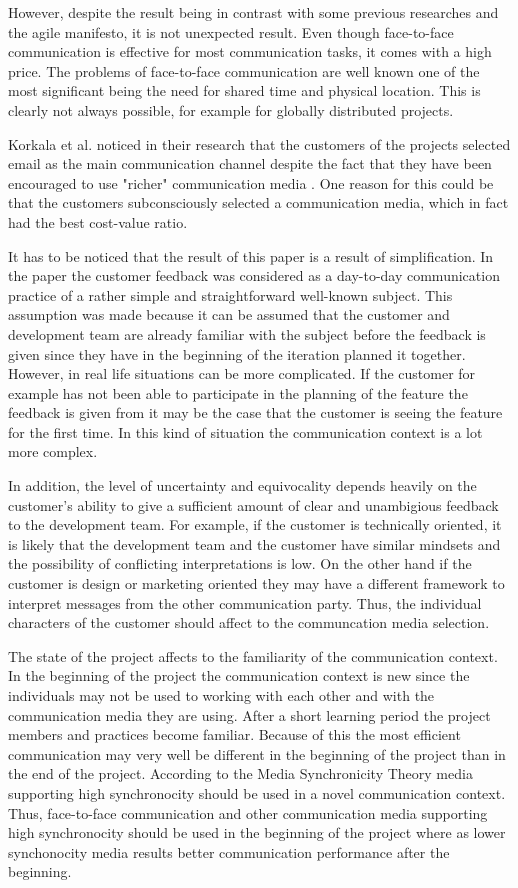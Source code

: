 \documentclass[conference]{IEEEtran}
\begin{document}
However, despite the result being in contrast with some previous researches and the agile manifesto, it is not unexpected result. Even though face-to-face communication is effective for most communication tasks, it comes with a high price. The problems of face-to-face communication are well known one of the most significant being the need for shared time and physical location. This is clearly not always possible, for example for globally distributed projects.

Korkala et al. noticed in their research that the customers of the projects selected email as the main communication channel despite the fact that they have been encouraged to use "richer" communication media \cite{2006korkala}. One reason for this could be that the customers subconsciously selected a communication media, which in fact had the best cost-value ratio.

It has to be noticed that the result of this paper is a result of simplification. In the paper the customer feedback was considered as a day-to-day communication practice of a rather simple and straightforward well-known subject. This assumption was made because it can be assumed that the customer and development team are already familiar with the subject before the feedback is given since they have in the beginning of the iteration planned it together. However, in real life situations can be more complicated. If the customer for example has not been able to participate in the planning of the feature the feedback is given from it may be the case that the customer is seeing the feature for the first time. In this kind of situation the communication context is a lot more complex.

In addition, the level of uncertainty and equivocality depends heavily on the customer's ability to give a sufficient amount of clear and unambigious feedback to the development team. For example, if the customer is technically oriented, it is likely that the development team and the customer have similar mindsets and the possibility of conflicting interpretations is low. On the other hand if the customer is design or marketing oriented they may have a different framework to interpret messages from the other communication party. Thus, the individual characters of the customer should affect to the communcation media selection.

The state of the project affects to the familiarity of the communication context. In the beginning of the project the communication context is new since the individuals may not be used to working with each other and with the communication media they are using. After a short learning period the project members and practices become familiar. Because of this the most efficient communication may very well be different in the beginning of the project than in the end of the project. According to the Media Synchronicity Theory media supporting high synchronocity should be used in a novel communication context. Thus, face-to-face communication and other communication media supporting high synchronocity should be used in the beginning of the project where as lower synchonocity media results better communication performance after the beginning.
\end{document}
